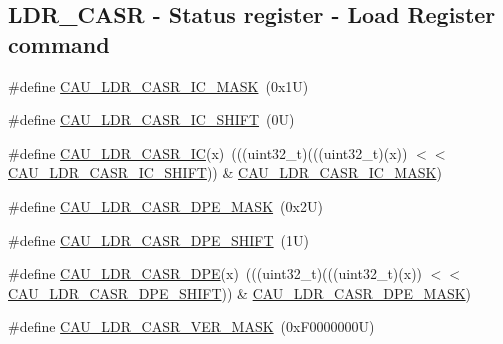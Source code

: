 \subsection*{L\+D\+R\+\_\+\+C\+A\+SR -\/ Status register -\/ Load Register command}
\begin{DoxyCompactItemize}
\item 
\#define \mbox{\hyperlink{group___c_a_u___register___masks_gae9945a982ee40a35ec7c92d32fd9956a}{C\+A\+U\+\_\+\+L\+D\+R\+\_\+\+C\+A\+S\+R\+\_\+\+I\+C\+\_\+\+M\+A\+SK}}~(0x1\+U)
\item 
\#define \mbox{\hyperlink{group___c_a_u___register___masks_ga262e6d420bd6efa036c7c6f8a3431c46}{C\+A\+U\+\_\+\+L\+D\+R\+\_\+\+C\+A\+S\+R\+\_\+\+I\+C\+\_\+\+S\+H\+I\+FT}}~(0\+U)
\item 
\#define \mbox{\hyperlink{group___c_a_u___register___masks_ga260ce1d3e6792373cd8b664d6fafd114}{C\+A\+U\+\_\+\+L\+D\+R\+\_\+\+C\+A\+S\+R\+\_\+\+IC}}(x)~(((uint32\+\_\+t)(((uint32\+\_\+t)(x)) $<$$<$ \mbox{\hyperlink{group___c_a_u___register___masks_ga262e6d420bd6efa036c7c6f8a3431c46}{C\+A\+U\+\_\+\+L\+D\+R\+\_\+\+C\+A\+S\+R\+\_\+\+I\+C\+\_\+\+S\+H\+I\+FT}})) \& \mbox{\hyperlink{group___c_a_u___register___masks_gae9945a982ee40a35ec7c92d32fd9956a}{C\+A\+U\+\_\+\+L\+D\+R\+\_\+\+C\+A\+S\+R\+\_\+\+I\+C\+\_\+\+M\+A\+SK}})
\item 
\#define \mbox{\hyperlink{group___c_a_u___register___masks_ga591913fd850627ba4dbbe23dff834f4e}{C\+A\+U\+\_\+\+L\+D\+R\+\_\+\+C\+A\+S\+R\+\_\+\+D\+P\+E\+\_\+\+M\+A\+SK}}~(0x2\+U)
\item 
\#define \mbox{\hyperlink{group___c_a_u___register___masks_gab1825cdea4d35d62af51b40a80524a61}{C\+A\+U\+\_\+\+L\+D\+R\+\_\+\+C\+A\+S\+R\+\_\+\+D\+P\+E\+\_\+\+S\+H\+I\+FT}}~(1\+U)
\item 
\#define \mbox{\hyperlink{group___c_a_u___register___masks_gabfead6ba0ffc853ac8318451a9f85fe5}{C\+A\+U\+\_\+\+L\+D\+R\+\_\+\+C\+A\+S\+R\+\_\+\+D\+PE}}(x)~(((uint32\+\_\+t)(((uint32\+\_\+t)(x)) $<$$<$ \mbox{\hyperlink{group___c_a_u___register___masks_gab1825cdea4d35d62af51b40a80524a61}{C\+A\+U\+\_\+\+L\+D\+R\+\_\+\+C\+A\+S\+R\+\_\+\+D\+P\+E\+\_\+\+S\+H\+I\+FT}})) \& \mbox{\hyperlink{group___c_a_u___register___masks_ga591913fd850627ba4dbbe23dff834f4e}{C\+A\+U\+\_\+\+L\+D\+R\+\_\+\+C\+A\+S\+R\+\_\+\+D\+P\+E\+\_\+\+M\+A\+SK}})
\item 
\#define \mbox{\hyperlink{group___c_a_u___register___masks_gac3ea78b4eacaf7b3cf614dee61564e86}{C\+A\+U\+\_\+\+L\+D\+R\+\_\+\+C\+A\+S\+R\+\_\+\+V\+E\+R\+\_\+\+M\+A\+SK}}~(0x\+F0000000\+U)
\item 

\end{DoxyCompactItemize}
